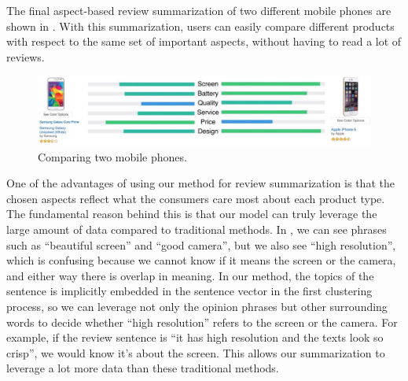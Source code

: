 The final aspect-based review summarization of two different mobile phones 
are shown in . 
With this summarization, users can easily compare different products 
with respect to the same set of important aspects, without having to 
read a lot of reviews.

\begin{figure}[th]
\centering
\includegraphics[width=1.0\columnwidth]{figures/comparison}
\caption{Comparing two mobile phones.}
\label{fig:experiments:comparison}
\end{figure}

One of the advantages of using our method for review summarization
is that the chosen aspects 
reflect what the consumers care most about each product type. 
The fundamental reason behind this is that our model can truly leverage 
the large amount of data compared to traditional methods. 
In , we can see phrases such as ``beautiful screen'' 
and ``good camera'', but we also see ``high resolution'', which 
is confusing because we cannot know if it means the screen or the camera, 
and either way there is overlap in meaning. In our method, the topics of 
the sentence is implicitly embedded in the sentence vector in the first 
clustering process, so we can leverage not only the opinion phrases 
but other surrounding words to decide whether ``high resolution'' 
refers to the screen or the camera. For example, if the review 
sentence is ``it has high resolution and the texts look so crisp'', 
we would know it's about the screen. This allows our summarization to 
leverage a lot more data than these traditional methods. 
